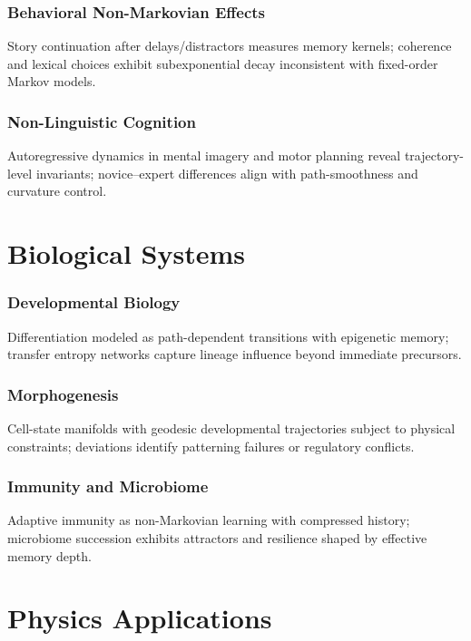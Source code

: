 \documentclass[12pt,a4paper]{article}
\theoremstyle{definition}
\begin{document}
\section{Behavioral Non-Markovian Effects}
Story continuation after delays/distractors measures memory kernels; coherence and lexical choices exhibit subexponential decay inconsistent with fixed-order Markov models.

\section{Non-Linguistic Cognition}
Autoregressive dynamics in mental imagery and motor planning reveal trajectory-level invariants; novice–expert differences align with path-smoothness and curvature control.

\part{Biological Systems}

\section{Developmental Biology}
Differentiation modeled as path-dependent transitions with epigenetic memory; transfer entropy networks capture lineage influence beyond immediate precursors.

\section{Morphogenesis}
Cell-state manifolds with geodesic developmental trajectories subject to physical constraints; deviations identify patterning failures or regulatory conflicts.

\section{Immunity and Microbiome}
Adaptive immunity as non-Markovian learning with compressed history; microbiome succession exhibits attractors and resilience shaped by effective memory depth.

\part{Physics Applications}
\end{document}
